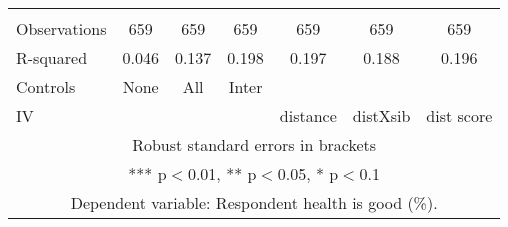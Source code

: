 \begin{tabular}{lcccccc}
 &  &  &  &  &  &  \\
Observations & 659 & 659 & 659 & 659 & 659 & 659 \\
R-squared & 0.046 & 0.137 & 0.198 & 0.197 & 0.188 & 0.196 \\
Controls & None & All & Inter &  &  &  \\
 IV &  &  &  & distance & distXsib & dist score \\ \hline
\multicolumn{7}{c}{ Robust standard errors in brackets} \\
\multicolumn{7}{c}{ *** p$<$0.01, ** p$<$0.05, * p$<$0.1} \\
\multicolumn{7}{c}{ Dependent variable: Respondent health is good (\%).} \\
\end{tabular}
